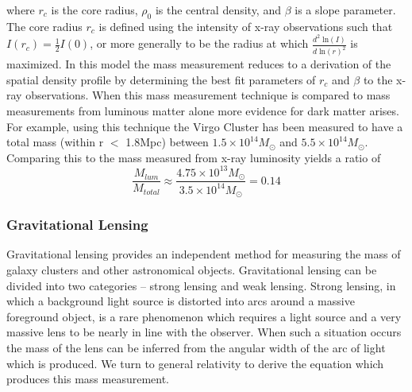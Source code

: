 \documentclass[a4paper,12pt]{article}
\begin{document}
where $r_c$ is the core radius, $\rho_0$ is the central density, and $\beta$ is a slope parameter.  \cite{Vikhlinin}  The core radius $r_c$ is defined using the intensity of x-ray observations such that $I(r_c)=\frac{1}{2}I(0)$, or more generally to be the radius at which $\frac{d^2 \; \text{ln}(I)}{d \; \text{ln}(r)^2}$ is maximized. In this model the mass measurement reduces to a derivation of the spatial density profile by determining the best fit parameters of $r_c$ and $\beta$ to the x-ray observations.  When this mass measurement technique is compared to mass measurements from luminous matter alone more evidence for dark matter arises. For example, using this technique the Virgo Cluster has been measured to have a total mass (within r $<$ 1.8Mpc) between $1.5 \times 10^{14} M_{\odot}$ and $5.5 \times10^{14} M_{\odot}$. \cite{Paradijs} Comparing this to the mass measured from x-ray luminosity yields a ratio of
\begin{equation} \label{betamodelmass}
\frac{M_{lum}}{M_{total}} \approx \frac{4.75 \times 10^{13} M_{\odot}}{3.5 \times 10^{14} M_{\odot}} = 0.14
\end{equation}

\subsubsection{Gravitational Lensing}


Gravitational lensing provides an independent method for measuring the mass of galaxy clusters and other astronomical objects.  Gravitational lensing can be divided into two categories -- strong lensing and weak lensing.  Strong lensing, in which a background light source is distorted into arcs around a massive foreground object, is a rare phenomenon which requires a light source and a very massive lens to be nearly in line with the observer.  When such a situation occurs the mass of the lens can be inferred from the angular width of the arc of light which is produced.  We turn to general relativity to derive the equation which produces this mass measurement.
\end{document}
